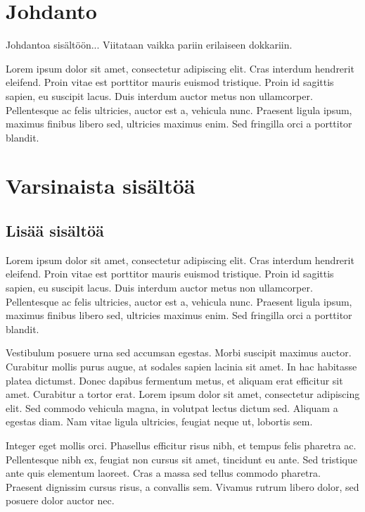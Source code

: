 \section{Johdanto}

Johdantoa sisältöön...
Viitataan vaikka pariin\cite{vahakainu_et_al} erilaiseen\cite{maenpaa_peltola} dokkariin\cite{wahle_et_al}.

Lorem ipsum dolor sit amet, consectetur adipiscing elit. Cras interdum hendrerit eleifend. Proin vitae est porttitor mauris euismod tristique. Proin id sagittis sapien, eu suscipit lacus. Duis interdum auctor metus non ullamcorper. Pellentesque ac felis ultricies, auctor est a, vehicula nunc. Praesent ligula ipsum, maximus finibus libero sed, ultricies maximus enim. Sed fringilla orci a porttitor blandit.

\section{Varsinaista sisältöä}

\subsection{Lisää sisältöä}

Lorem ipsum dolor sit amet, consectetur adipiscing elit. Cras interdum hendrerit eleifend. Proin vitae est porttitor mauris euismod tristique. Proin id sagittis sapien, eu suscipit lacus. Duis interdum auctor metus non ullamcorper. Pellentesque ac felis ultricies, auctor est a, vehicula nunc. Praesent ligula ipsum, maximus finibus libero sed, ultricies maximus enim. Sed fringilla orci a porttitor blandit.

Vestibulum posuere urna sed accumsan egestas. Morbi suscipit maximus auctor. Curabitur mollis purus augue, at sodales sapien lacinia sit amet. In hac habitasse platea dictumst. Donec dapibus fermentum metus, et aliquam erat efficitur sit amet. Curabitur a tortor erat. Lorem ipsum dolor sit amet, consectetur adipiscing elit. Sed commodo vehicula magna, in volutpat lectus dictum sed. Aliquam a egestas diam. Nam vitae ligula ultricies, feugiat neque ut, lobortis sem.

Integer eget mollis orci. Phasellus efficitur risus nibh, et tempus felis pharetra ac. Pellentesque nibh ex, feugiat non cursus sit amet, tincidunt eu ante. Sed tristique ante quis elementum laoreet. Cras a massa sed tellus commodo pharetra. Praesent dignissim cursus risus, a convallis sem. Vivamus rutrum libero dolor, sed posuere dolor auctor nec.

